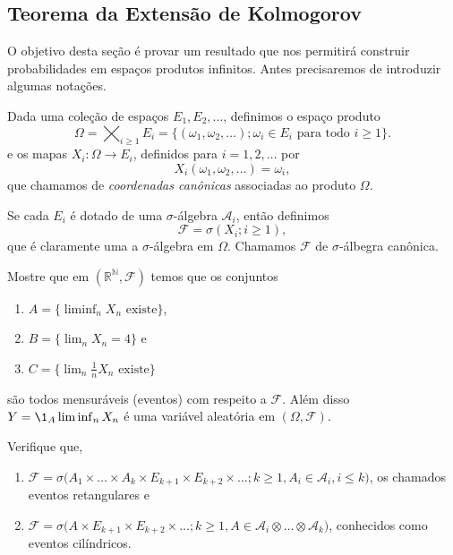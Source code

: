 \subsection{Teorema da Extensão de Kolmogorov}

O objetivo desta seção é provar um resultado que nos permitirá construir probabilidades em espaços produtos infinitos.
Antes precisaremos de introduzir algumas notações.

Dada uma coleção de espaços $E_1, E_2, \dots$, definimos o espaço produto
\begin{equation}
  \Omega = \bigtimes_{i\geq 1} E_i = \big\{(\omega_1, \omega_2, \dots); \omega_i \in E_i \text{ para todo $i \geq 1$}\big\}.
\end{equation}
e os mapas $X_i:\Omega \to E_i$, definidos para $i = 1, 2, \dots$ por
\begin{equation}
  X_i(\omega_1, \omega_2, \dots) = \omega_i,
\end{equation}
que chamamos de \emph{coordenadas canônicas}  associadas ao produto $\Omega$.

Se cada $E_i$ é dotado de uma $\sigma$-álgebra $\mathcal{A}_i$, então definimos
\begin{equation}
  \mathcal{F} = \sigma(X_i; i \geq 1),
\end{equation}
que é claramente uma a $\sigma$-álgebra em $\Omega$.
Chamamos $\mathcal{F}$ de $\sigma$-álbegra canônica.

\begin{exercise}
  Mostre que em $(\mathbb{R}^{\mathbb{N}},\mathcal{F})$ temos que os conjuntos
  \begin{enumerate}[\quad a)]
  \item $A = \{ \liminf_n X_n \text{ existe}\}$,
  \item $B = \{ \lim_n X_n = 4\}$ e
  \item $C = \{ \lim_n \tfrac{1}{n} X_n \text{ existe}\}$
  \end{enumerate}
  são todos mensuráveis (eventos) com respeito a $\mathcal{F}$.
  Além disso $Y = \1_A \liminf_n X_n$ é uma variável aleatória em $(\Omega, \mathcal{F})$.
\end{exercise}

\begin{exercise}
  Verifique que,
  \begin{enumerate}[\quad a)]
  \item $\mathcal{F} = \sigma\big(A_1 \times \dots \times A_k \times E_{k+1} \times E_{k+2} \times \dots; k \geq 1, A_i \in \mathcal{A}_i, i \leq k\big)$, os chamados eventos retangulares e
  \item $\mathcal{F} = \sigma\big(A \times E_{k+1} \times E_{k+2} \times \dots; k \geq 1, A \in \mathcal{A}_i \otimes \dots \otimes \mathcal{A}_k\big)$, conhecidos como eventos cilíndricos.
  \end{enumerate}
\end{exercise}

